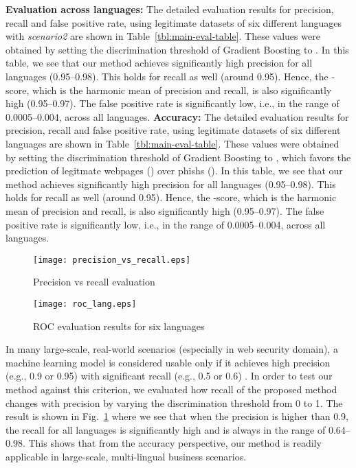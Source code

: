\documentclass[10pt,conference,compsocconf,letterpaper]{IEEEtran}
\begin{document}
\textbf{Evaluation across languages:} The detailed evaluation results for precision, recall and false positive rate, using legitimate datasets of six different languages with \textit{scenario2} are shown in Table~\ref{tbl:main-eval-table}. These values were obtained by setting the discrimination threshold of Gradient Boosting to . 
In this table, we see that our method achieves significantly high precision for all languages (0.95--0.98). This holds for recall as well (around 0.95). Hence, the -score, which is the harmonic mean of precision and recall, is also significantly high  (0.95--0.97). The false positive rate is significantly low, i.e., in the range of 0.0005--0.004, across all languages. 
\else
\noindent\textbf{Accuracy:}
The detailed evaluation results for precision, recall and false positive rate, using legitimate datasets of six different languages are shown in Table~\ref{tbl:main-eval-table}. These values were obtained by setting the discrimination threshold of Gradient Boosting to , which favors the prediction of legitmate webpages  () over phishs (). 
In this table, we see that our method achieves significantly high precision for all languages (0.95--0.98). This holds for recall as well (around 0.95). Hence, the -score, which is the harmonic mean of precision and recall, is also significantly high (0.95--0.97). The false positive rate is significantly low, i.e., in the range of 0.0005--0.004, across all languages.
\fi

\begin{figure}[th]
                \centering
                \texttt{[image: precision\_vs\_recall.eps]}
                \caption{Precision vs recall evaluation}
                \label{fig:precision-vs-recall}
\end{figure} 

\begin{figure}[th]
                \centering
                \texttt{[image: roc\_lang.eps]}
                \caption{ROC evaluation results for six languages}
                \label{fig:roc-lang}
\end{figure} 

In many large-scale, real-world scenarios (especially in web security domain),  a machine learning model is considered usable only if it achieves high precision (e.g., 0.9 or 0.95) with significant recall (e.g., 0.5 or 0.6) \cite{singh:2012:large}. In order to test our method against this criterion, we evaluated how recall of the proposed method changes with precision by varying the discrimination threshold from 0 to 1. The result is shown in Fig.~\ref{fig:precision-vs-recall} where we see that when the precision is higher than 0.9, the recall for all languages is significantly high and is always in the range of 0.64--0.98. This shows that from the accuracy perspective, our method is readily applicable  in large-scale, multi-lingual business scenarios.
\end{document}
